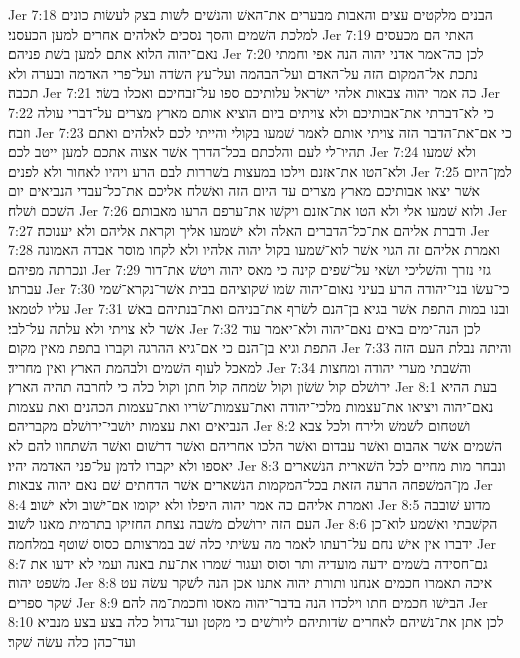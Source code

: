Jer 7:18  הבנים מלקטים עצים והאבות מבערים את־האשׁ והנשׁים לשׁות בצק לעשׂות כונים למלכת השׁמים והסך נסכים לאלהים אחרים למען הכעסני׃
Jer 7:19  האתי הם מכעסים נאם־יהוה הלוא אתם למען בשׁת פניהם׃
Jer 7:20  לכן כה־אמר אדני יהוה הנה אפי וחמתי נתכת אל־המקום הזה על־האדם ועל־הבהמה ועל־עץ השׂדה ועל־פרי האדמה ובערה ולא תכבה׃
Jer 7:21  כה אמר יהוה צבאות אלהי ישׂראל עלותיכם ספו על־זבחיכם ואכלו בשׂר׃
Jer 7:22  כי לא־דברתי את־אבותיכם ולא צויתים ביום הוציא אותם מארץ מצרים על־דברי עולה וזבח׃
Jer 7:23  כי אם־את־הדבר הזה צויתי אותם לאמר שׁמעו בקולי והייתי לכם לאלהים ואתם תהיו־לי לעם והלכתם בכל־הדרך אשׁר אצוה אתכם למען ייטב לכם׃
Jer 7:24  ולא שׁמעו ולא־הטו את־אזנם וילכו במעצות בשׁררות לבם הרע ויהיו לאחור ולא לפנים׃
Jer 7:25  למן־היום אשׁר יצאו אבותיכם מארץ מצרים עד היום הזה ואשׁלח אליכם את־כל־עבדי הנביאים יום השׁכם ושׁלח׃
Jer 7:26  ולוא שׁמעו אלי ולא הטו את־אזנם ויקשׁו את־ערפם הרעו מאבותם׃
Jer 7:27  ודברת אליהם את־כל־הדברים האלה ולא ישׁמעו אליך וקראת אליהם ולא יענוכה׃
Jer 7:28  ואמרת אליהם זה הגוי אשׁר לוא־שׁמעו בקול יהוה אלהיו ולא לקחו מוסר אבדה האמונה ונכרתה מפיהם׃
Jer 7:29  גזי נזרך והשׁליכי ושׂאי על־שׁפים קינה כי מאס יהוה ויטשׁ את־דור עברתו׃
Jer 7:30  כי־עשׂו בני־יהודה הרע בעיני נאום־יהוה שׂמו שׁקוציהם בבית אשׁר־נקרא־שׁמי עליו לטמאו׃
Jer 7:31  ובנו במות התפת אשׁר בגיא בן־הנם לשׂרף את־בניהם ואת־בנתיהם באשׁ אשׁר לא צויתי ולא עלתה על־לבי׃
Jer 7:32  לכן הנה־ימים באים נאם־יהוה ולא־יאמר עוד התפת וגיא בן־הנם כי אם־גיא ההרגה וקברו בתפת מאין מקום׃
Jer 7:33  והיתה נבלת העם הזה למאכל לעוף השׁמים ולבהמת הארץ ואין מחריד׃
Jer 7:34  והשׁבתי מערי יהודה ומחצות ירושׁלם קול שׂשׂון וקול שׂמחה קול חתן וקול כלה כי לחרבה תהיה הארץ׃
Jer 8:1  בעת ההיא נאם־יהוה ויציאו את־עצמות מלכי־יהודה ואת־עצמות־שׂריו ואת־עצמות הכהנים ואת עצמות הנביאים ואת עצמות יושׁבי־ירושׁלם מקבריהם׃
Jer 8:2  ושׁטחום לשׁמשׁ ולירח ולכל צבא השׁמים אשׁר אהבום ואשׁר עבדום ואשׁר הלכו אחריהם ואשׁר דרשׁום ואשׁר השׁתחוו להם לא יאספו ולא יקברו לדמן על־פני האדמה יהיו׃
Jer 8:3  ונבחר מות מחיים לכל השׁארית הנשׁארים מן־המשׁפחה הרעה הזאת בכל־המקמות הנשׁארים אשׁר הדחתים שׁם נאם יהוה צבאות׃
Jer 8:4  ואמרת אליהם כה אמר יהוה היפלו ולא יקומו אם־ישׁוב ולא ישׁוב׃
Jer 8:5  מדוע שׁובבה העם הזה ירושׁלם משׁבה נצחת החזיקו בתרמית מאנו לשׁוב׃
Jer 8:6  הקשׁבתי ואשׁמע לוא־כן ידברו אין אישׁ נחם על־רעתו לאמר מה עשׂיתי כלה שׁב במרצותם כסוס שׁוטף במלחמה׃
Jer 8:7  גם־חסידה בשׁמים ידעה מועדיה ותר וסוס ועגור שׁמרו את־עת באנה ועמי לא ידעו את משׁפט יהוה׃
Jer 8:8  איכה תאמרו חכמים אנחנו ותורת יהוה אתנו אכן הנה לשׁקר עשׂה עט שׁקר ספרים׃
Jer 8:9  הבישׁו חכמים חתו וילכדו הנה בדבר־יהוה מאסו וחכמת־מה להם׃
Jer 8:10  לכן אתן את־נשׁיהם לאחרים שׂדותיהם ליורשׁים כי מקטן ועד־גדול כלה בצע בצע מנביא ועד־כהן כלה עשׂה שׁקר׃
